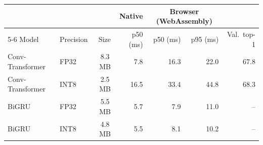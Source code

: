 \begin{tabular}{llrrrrr}
\toprule
 & & & Native & \multicolumn{2}{c}{Browser (WebAssembly)} & \\
\cmidrule(lr){5-6}
Model & Precision & Size & p50 (ms) & p50 (ms) & p95 (ms) & Val.\ top-1 \\
\midrule
Conv-Transformer & FP32 & 8.3\,MB & 7.8 & 16.3 & 22.0 & 67.8 \\
Conv-Transformer & INT8 & 2.5\,MB & 16.5 & 33.4 & 44.8 & 68.3 \\
BiGRU & FP32 & 5.5\,MB & 5.7 & 7.9 & 11.0 & -- \\
BiGRU & INT8 & 4.8\,MB & 5.5 & 8.1 & 10.2 & -- \\
\bottomrule
\end{tabular}
